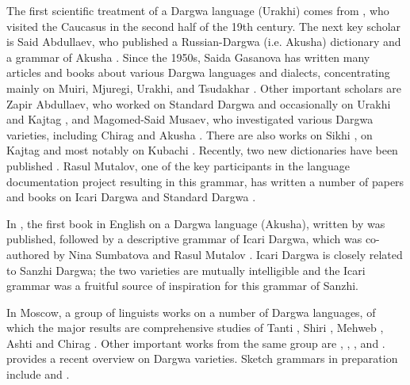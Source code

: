 The first scientific treatment of a Dargwa language (Urakhi) comes from \citet{Uslar1892}, who visited the Caucasus in the second half of the 19th century. The next key scholar is Said Abdullaev, who published a Russian-Dargwa (i.e. Akusha) dictionary and a grammar of Akusha \citep{Abdullaev1950, Abdullaev1954}. Since the 1950s, Saida Gasanova has written many articles and books about various Dargwa languages and dialects, concentrating mainly on Muiri, Mjuregi, Urakhi, and Tsudakhar \citep[e.g.][]{Gasanova1961, Gasanova1971}. Other important scholars are Zapir Abdullaev, who worked on Standard Dargwa and occasionally on Urakhi and Kajtag \citep[e.g.][]{Abdullaev1961, Abdullaev1969, Abdullaev1971, Abdullaev1986, Abdullaev1993, AbdullaevEtAl2014}, and Magomed-Said Musaev, who investigated various Dargwa varieties, including Chirag and Akusha \citep[e.g.][]{Musaev1975, Musaev1978, Musaev1983, Musaev1980a, Musaev1984}. There are also works on Sikhi \citep{Kadibagomedov1998}, on Kajtag \citep{Temirbulatova2005} and most notably on Kubachi \citep{Magometov1963}. Recently, two new dictionaries have been published \citep{Jusupov2005, Jusupov2009}. Rasul Mutalov, one of the key participants in the language documentation project resulting in this grammar, has written a number of papers and books on Icari Dargwa and Standard Dargwa \citep{Mutalov1992, Mutalov2002, Mutalov2018}.

In , the first book in English on a Dargwa language (Akusha), written by  was published, followed by a descriptive grammar of Icari Dargwa, which was co-authored by Nina Sumbatova and Rasul Mutalov \citep{Sumbatova.Mutalov2003}. Icari Dargwa is closely related to Sanzhi Dargwa; the two varieties are mutually intelligible and the Icari grammar was a fruitful source of inspiration for this grammar of Sanzhi.

In Moscow, a group of linguists works on a number of Dargwa languages, of which the major results are comprehensive studies of Tanti \citep{Sumbatova.Lander2014}, Shiri \citep{BelyaevInPreparation}, Mehweb \citep{DanielMehweb}, Ashti \citep{Belyaev2012} and Chirag \citep{GanenkovChiragSketch}. Other important works from the same group are \citet{Kalinina.Sumbatova2007}, \citet{Sumbatova2009, Sumbatova2010, Sumbatova2011, Sumbatova2013}, \citet{Lander2008, Lander2010}, and \citet{Serdobolskaya2009, Serdobolskaya2010}. \citet{SumbatovaInPreparation} provides a recent overview on Dargwa varieties. Sketch grammars in preparation include \citet{GanenkovChiragSketch} and \citet{ForkerSanzhiSketch}.

